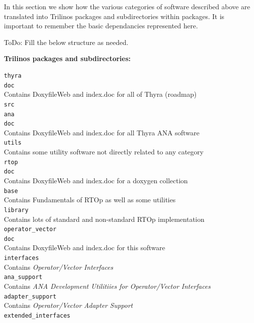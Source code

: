 \documentclass[pdf,ps2pdf,11pt]{SANDreport}
\begin{document}
In this section we show how the various categories of software described above
are translated into Trilinos packages and subdirectories within packages.  It
is important to remember the basic dependancies represented here.

ToDo: Fill the below structure as needed.

\noindent{}\textbf{Trilinos packages and subdirectories:}
%

\bifthen
\>\texttt{thyra} \\
\>\>\texttt{doc}\\
\>\>\>Contains DoxyfileWeb and index.doc for all of Thyra (roadmap) \\
\>\>\texttt{src} \\
\>\>\>\texttt{ana} \\
\>\>\>\>\texttt{doc}\\
\>\>\>\>\>Contains DoxyfileWeb and index.doc for all Thyra ANA software \\
\>\>\>\>\texttt{utils}\\
\>\>\>\>\>Contains some utility software not directly related to any category \\
\>\>\>\>\texttt{rtop}\\
\>\>\>\>\>\texttt{doc}\\
\>\>\>\>\>\>Contains DoxyfileWeb and index.doc for a doxygen collection \\
\>\>\>\>\>\texttt{base}\\
\>\>\>\>\>\>Contains Fundamentals of RTOp as well as some utilities \\
\>\>\>\>\>\texttt{library}\\
\>\>\>\>\>\>Contains lots of standard and non-standard RTOp implementation \\
\>\>\>\>\texttt{operator\_vector} \\
\>\>\>\>\>\texttt{doc}\\
\>\>\>\>\>\>Contains DoxyfileWeb and index.doc for this software \\
\>\>\>\>\>\texttt{interfaces} \\
\>\>\>\>\>\>Contains {}\textit{Operator/Vector Interfaces} \\
\>\>\>\>\>\texttt{ana\_support}\\
\>\>\>\>\>\>Contains {}\textit{ANA Development Utilitiies for Operator/Vector Interfaces} \\
\>\>\>\>\>\texttt{adapter\_support}\\
\>\>\>\>\>\>Contains {}\textit{Operator/Vector Adapter Support} \\
\>\>\>\>\>\texttt{extended\_interfaces} \\
\end{document}
